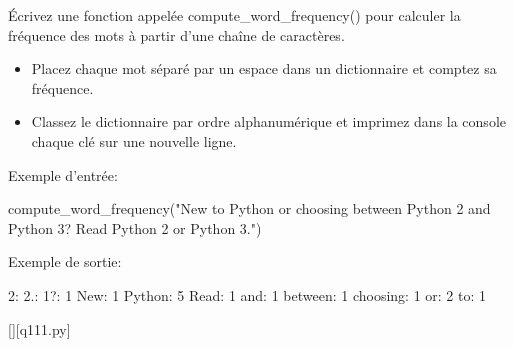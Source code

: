 		\question
		Écrivez une fonction appelée compute\_word\_frequency() pour calculer la fréquence des mots à partir d'une chaîne de caractères.
		
		  \begin{itemize}
		  \item Placez chaque mot séparé par un espace dans un dictionnaire et comptez sa fréquence.
		  \item Classez le dictionnaire par ordre alphanumérique et imprimez dans la console chaque clé sur une nouvelle ligne.
		  \end{itemize}
		
		Exemple d'entrée:
		
		compute\_word\_frequency("New to Python or choosing between Python 2 and Python 3? Read Python 2 or Python 3.")
		
		Exemple de sortie:
		
		2: 2.: 1?: 1\newline
		New: 1\newline
		Python: 5\newline
		Read: 1\newline
		and: 1\newline
		between: 1\newline
		choosing: 1\newline
		or: 2\newline
		to: 1
		\par
		\renewcommand{\nomfichier}{q111.py}
		\begin{solution}
		    \pythonfile{\chemincode \nomfichier}[][\nomfichier]
		\end{solution}
        
